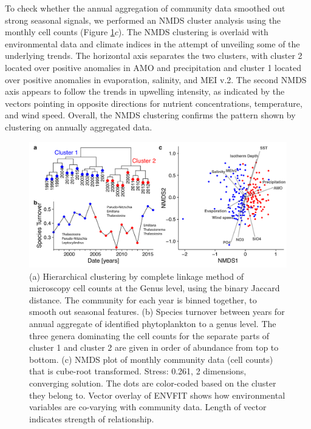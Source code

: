 \documentclass[draft]{agujournal2019}
\begin{document}
To check whether the annual aggregation of community data smoothed out strong seasonal signals, we performed an NMDS cluster analysis using the monthly cell counts (Figure \ref{fig:clustering}$c$). The NMDS clustering is overlaid with environmental data and climate indices in the attempt of unveiling some of the underlying trends. The horizontal axis separates the two clusters, with cluster 2 located over positive anomalies in AMO and precipitation and cluster 1 located over positive anomalies in evaporation, salinity, and MEI v.2. The second NMDS axis appears to follow the trends in upwelling intensity, as indicated by the vectors pointing in opposite directions for nutrient concentrations, temperature, and wind speed. Overall, the NMDS clustering confirms the pattern shown by clustering on annually aggregated data. 

\begin{figure}
\noindent\includegraphics[width=\textwidth]{fig/Figure4_ClusteringNMDS_v2.pdf}
\caption{(a) Hierarchical clustering by complete linkage method of microscopy cell counts at the Genus level, using the binary Jaccard distance. The community for each year is binned together, to smooth out seasonal features. (b) Species turnover between years for annual aggregate of identified phytoplankton to a genus level. The three genera dominating the cell counts for the separate parts of cluster 1 and cluster 2 are given in order of abundance from top to bottom. (c) NMDS plot of monthly community data (cell counts) that is cube-root transformed. Stress: 0.261, 2 dimensions, converging solution. The dots are color-coded based on the cluster they belong to. Vector overlay of ENVFIT shows how environmental variables are co-varying with community data. Length of vector indicates strength of relationship.}
\label{fig:clustering}
\end{figure}
\end{document}
